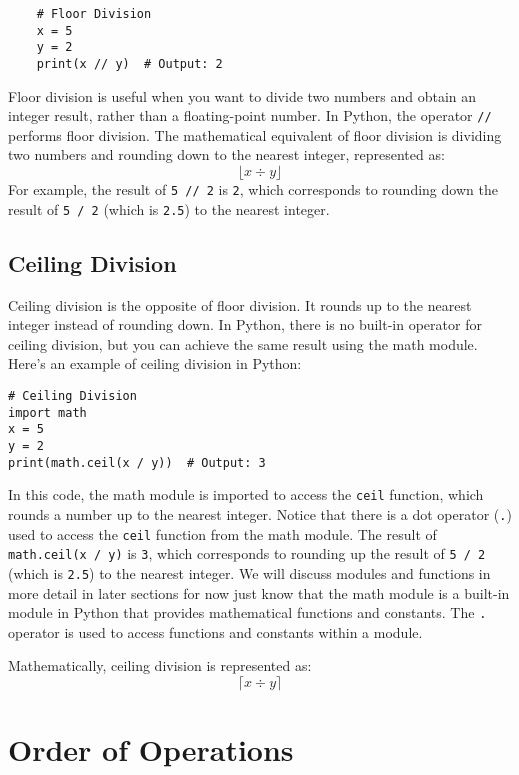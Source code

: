 \begin{lstlisting}
    # Floor Division
    x = 5
    y = 2
    print(x // y)  # Output: 2
\end{lstlisting}
    
Floor division is useful when you want to divide two numbers and obtain an integer result, rather than a floating-point number. In Python, the operator \lstinline|//| performs floor division. The mathematical equivalent of floor division is dividing two numbers and rounding down to the nearest integer, represented as:
    \[
    \lfloor x \div y \rfloor
    \]
For example, the result of \lstinline|5 // 2| is \lstinline|2|, which corresponds to rounding down the result of \lstinline|5 / 2| (which is \lstinline|2.5|) to the nearest integer.

\subsection{Ceiling Division}
Ceiling division is the opposite of floor division. It rounds up to the nearest integer instead of rounding down. In Python, there is no built-in operator for ceiling division, but you can achieve the same result using the math module. Here's an example of ceiling division in Python:

\begin{lstlisting}
# Ceiling Division
import math
x = 5
y = 2
print(math.ceil(x / y))  # Output: 3
\end{lstlisting}

In this code, the math module is imported to access the \lstinline|ceil| function, which rounds a number up to the nearest integer. Notice that there is a dot operator (\lstinline|.|) used to access the \lstinline|ceil| function from the math module. The result of \lstinline|math.ceil(x / y)| is \lstinline|3|, which corresponds to rounding up the result of \lstinline|5 / 2| (which is \lstinline|2.5|) to the nearest integer. We will discuss modules and functions in more detail in later sections for now just know that the math module is a built-in module in Python that provides mathematical functions and constants. The \lstinline|.| operator is used to access functions and constants within a module.

Mathematically, ceiling division is represented as:
\[
\lceil x \div y \rceil
\]

\section{Order of Operations}

